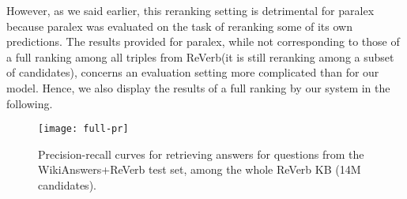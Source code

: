 \documentclass[runningheads,a4paper]{llncs}
\newcommand{\rv}{{\sc ReVerb}\xspace}
\newcommand{\wkrv}{{\sc WikiAnswers+ReVerb}\xspace}
\begin{document}
However, as we said earlier, this reranking setting is detrimental for {\sc paralex} because {\sc paralex} was evaluated on the task of reranking some of its own predictions.
The results provided for {\sc paralex}, while not corresponding to those of a full ranking among all triples from \rv (it is still reranking among a subset of candidates), concerns an evaluation setting more complicated than for our model.
Hence, we also display the results of a full ranking by our system in the following.


\begin{figure}[t]
\vskip 0.2in
\begin{center}
\centerline{\texttt{[image: full-pr]}}
\caption{Precision-recall curves for retrieving answers for questions from the \wkrv test set, among the whole \rv KB (14M candidates).}
\label{fig:fpr}
\end{center}
\vskip -0.2in
\end{figure} 
\end{document}

